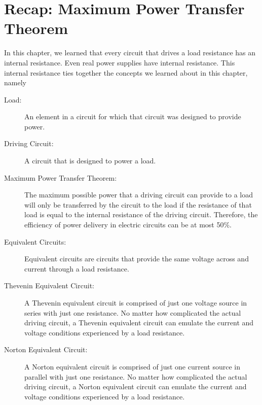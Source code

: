 \section{Recap: Maximum Power Transfer Theorem}
In this chapter, we learned that every circuit that drives a load resistance has an internal resistance. Even real power supplies have internal resistance. This internal resistance ties together the concepts we learned about in this chapter, namely
\begin{description}
\item[Load:] An element in a circuit for which that circuit was designed to provide power.
\item[Driving Circuit:] A circuit that is designed to power a load.
\item[Maximum Power Transfer Theorem:] The maximum possible power that a driving circuit can provide to a load will only be transferred by the circuit to the load if the resistance of that load is equal to the internal resistance of the driving circuit. Therefore, the efficiency of power delivery in electric circuits can be at most 50$\%$.
\item[Equivalent Circuits:] Equivalent circuits are circuits that provide the same voltage across and current through a load resistance. 
\item[Thevenin Equivalent Circuit:] A Thevenin equivalent circuit is comprised of just one voltage source in series with just one resistance. No matter how complicated the actual driving circuit, a Thevenin equivalent circuit can emulate the current and voltage conditions experienced by a load resistance. 
\item[Norton Equivalent Circuit:] A Norton equivalent circuit is comprised of just one current source in parallel with just one resistance. No matter how complicated the actual driving circuit, a Norton equivalent circuit can emulate the current and voltage conditions experienced by a load resistance. 
\end{description}
